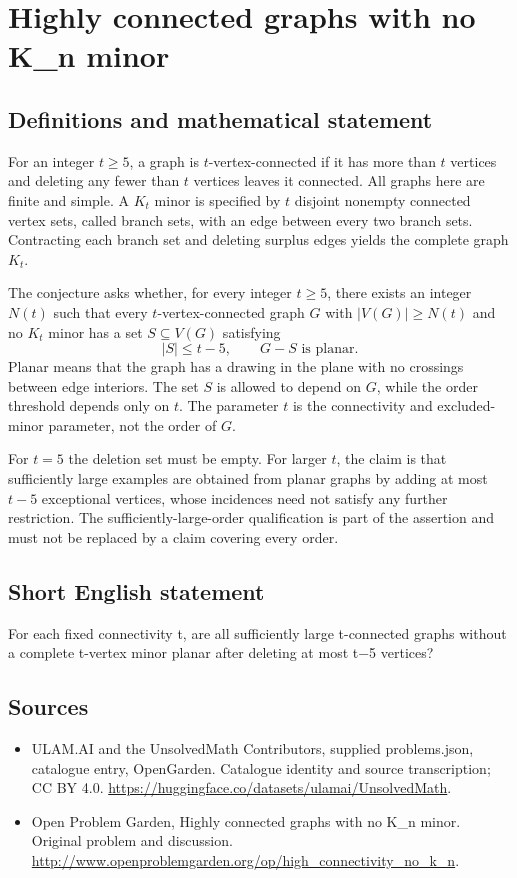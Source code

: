 \documentclass[11pt,a4paper]{article}
\begin{document}
\section*{Highly connected graphs with no K\_n minor}\label{statement}

\subsection{Definitions and mathematical statement}
For an integer $t\ge5$, a graph is $t$-vertex-connected if it has more than $t$ vertices and deleting any fewer than $t$ vertices leaves it connected. All graphs here are finite and simple. A $K_t$ minor is specified by $t$ disjoint nonempty connected vertex sets, called branch sets, with an edge between every two branch sets. Contracting each branch set and deleting surplus edges yields the complete graph $K_t$.

The conjecture asks whether, for every integer $t\ge5$, there exists an integer $N(t)$ such that every $t$-vertex-connected graph $G$ with $|V(G)|\ge N(t)$ and no $K_t$ minor has a set $S\subseteq V(G)$ satisfying
\[
             |S|\le t-5,\qquad G-S\text{ is planar}.
\]
Planar means that the graph has a drawing in the plane with no crossings between edge interiors. The set $S$ is allowed to depend on $G$, while the order threshold depends only on $t$. The parameter $t$ is the connectivity and excluded-minor parameter, not the order of $G$.

For $t=5$ the deletion set must be empty. For larger $t$, the claim is that sufficiently large examples are obtained from planar graphs by adding at most $t-5$ exceptional vertices, whose incidences need not satisfy any further restriction. The sufficiently-large-order qualification is part of the assertion and must not be replaced by a claim covering every order.
\subsection{Short English statement}
For each fixed connectivity t, are all sufficiently large t-connected graphs without a complete t-vertex minor planar after deleting at most t−5 vertices?
\subsection{Sources}
\begin{itemize}
\item[S1] ULAM.AI and the UnsolvedMath Contributors, supplied problems.json, catalogue entry, OpenGarden. Catalogue identity and source transcription; CC BY 4.0.
\url{https://huggingface.co/datasets/ulamai/UnsolvedMath}.
\item[S2] Open Problem Garden, Highly connected graphs with no K\_n minor. Original problem and discussion.
\url{http://www.openproblemgarden.org/op/high_connectivity_no_k_n}.
\end{itemize}
\end{document}
